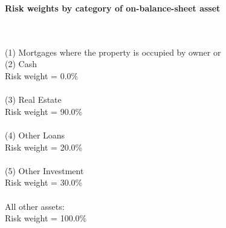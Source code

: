 \documentclass{article}
\begin{document}
\setlength{\parindent}{0em}
\begin{center}{\bf Risk weights by category of on-balance-sheet asset}\end{center}
~\\
~\\

(1) Mortgages where the property is occupied by owner or \\
(2) Cash \\
Risk weight = 0.0\%\\

~\\
(3) Real Estate\\
Risk weight = 90.0\%\\

~\\
(4) Other Loans\\
Risk weight = 20.0\%\\

~\\
(5) Other Investment\\
Risk weight = 30.0\%\\

~\\
All other assets:\\
Risk weight = 100.0\%\\

~\\
\end{document}
